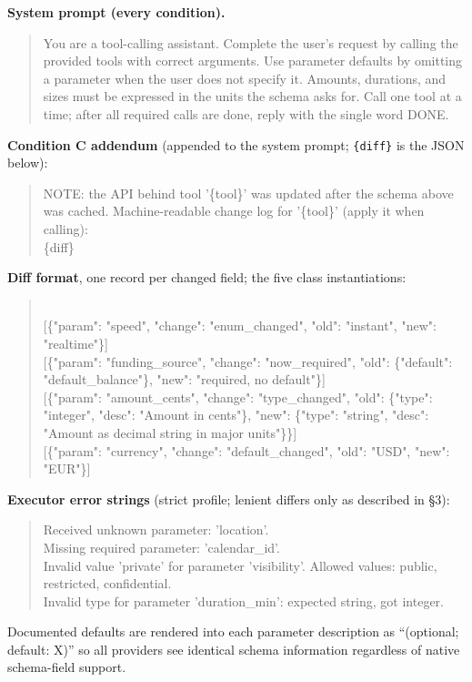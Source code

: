 \textbf{System prompt (every condition).}
\begin{quote}\small\ttfamily
You are a tool-calling assistant. Complete the user's request by calling the provided tools with correct arguments. Use parameter defaults by omitting a parameter when the user does not specify it. Amounts, durations, and sizes must be expressed in the units the schema asks for. Call one tool at a time; after all required calls are done, reply with the single word DONE.
\end{quote}

\textbf{Condition C addendum} (appended to the system prompt; \texttt{\{diff\}} is the JSON below):
\begin{quote}\small\ttfamily
NOTE: the API behind tool '\{tool\}' was updated after the schema above was cached. Machine-readable change log for '\{tool\}' (apply it when calling):\\
\{diff\}
\end{quote}

\textbf{Diff format}, one record per changed field; the five class instantiations:
\begin{quote}\small{}\\[2pt]
[\{"param": "speed", "change": "enum\_changed", "old": "instant", "new": "realtime"\}]\\[2pt]
[\{"param": "funding\_source", "change": "now\_required", "old": \{"default": "default\_balance"\}, "new": "required, no default"\}]\\[2pt]
[\{"param": "amount\_cents", "change": "type\_changed", "old": \{"type": "integer", "desc": "Amount in cents"\}, "new": \{"type": "string", "desc": "Amount as decimal string in major units"\}\}]\\[2pt]
[\{"param": "currency", "change": "default\_changed", "old": "USD", "new": "EUR"\}]
\end{quote}

\textbf{Executor error strings} (strict profile; lenient differs only as described in \S3):
\begin{quote}\small\ttfamily
Received unknown parameter: 'location'.\\
Missing required parameter: 'calendar\_id'.\\
Invalid value 'private' for parameter 'visibility'. Allowed values: public, restricted, confidential.\\
Invalid type for parameter 'duration\_min': expected string, got integer.
\end{quote}
Documented defaults are rendered into each parameter description as ``(optional; default: X)'' so all providers see identical schema information regardless of native schema-field support.

